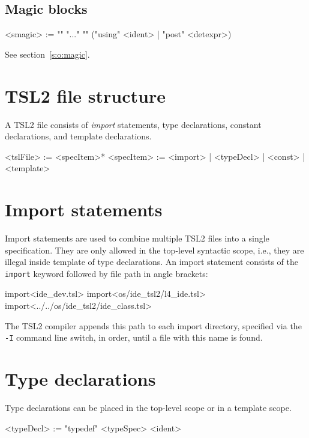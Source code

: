 \documentclass{report}
\newcommand{\src}[1]{\texttt{#1}}
\newcommand{\tsl}{TSL2 }
\begin{document}
\subsection{Magic blocks}

\begin{bnflisting}{}
<smagic> := "{" "..." "}" ("using" <ident> | "post" <detexpr>)
\end{bnflisting}

See section~\ref{s:o:magic}.

\section{\tsl file structure}

A \tsl file consists of \emph{import} statements, type 
declarations, constant declarations, and template declarations.

\begin{bnflisting}{}
<tslFile>  := <specItem>*
<specItem> := <import>
           |  <typeDecl>
           |  <const>
           |  <template>
\end{bnflisting}

\section{Import statements}

Import statements are used to combine multiple \tsl files into a 
single specification.  They are only allowed in the top-level 
syntactic scope, i.e., they are illegal inside template of type 
declarations.  An import statement consists of the \src{import} 
keyword followed by file path in angle brackets:
\begin{tsllisting}{}
import<ide_dev.tsl>
import<os/ide_tsl2/l4_ide.tsl>
import<../../os/ide_tsl2/ide_class.tsl>
\end{tsllisting}
The \tsl compiler appends this path to each import directory, 
specified via the \src{-I} command line switch, in order, until a  
file with this name is found.

\section{Type declarations}\label{s:r:typedecl}

Type declarations can be placed in the top-level scope or in a
template scope.

\begin{bnflisting}{}
<typeDecl> := "typedef" <typeSpec> <ident>
\end{bnflisting}
\end{document}
